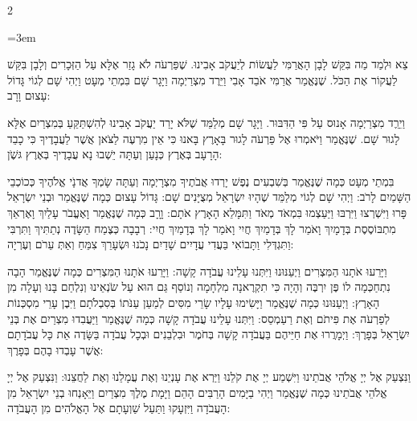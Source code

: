\documentclass[11pt, openany]{book}
\newenvironment{bilingual}{%
  \par\vspace{4pt}%
  \begin{paracol}{2}%
}{%
  \end{paracol}%
  \par\vspace{2pt}%
}
\newenvironment{hebrewcol}{%
  \switchcolumn[1]%
  \begingroup
  \RTL
  \hebrewfont\large
  \setstretch{1.4}%
  \emergencystretch=3em
  \tolerance=9999
  \parindent=0pt\relax
}{%
  \endRTL
  \endgroup
}
\begin{document}
\begin{bilingual}
\begin{hebrewcol}
צֵא וּלְמַד מַה בִּקֵּשׁ לָבָן הָאֲרַמִּי לַעֲשׂוֹת לְיַעֲקֹב אָבִינוּ. שֶׁפַּרְעֹה לֹא גָזַר אֶלָּא עַל הַזְּכָרִים וְלָבָן בִּקֵּשׁ לַעֲקוֹר אֶת הַכֹּל. שֶׁנֶּאֱמַר אֲרַמִּי אֹבֵד אָבִי וַיֵּרֶד מִצְרַיְמָה וַיָּגָר שָׁם בִּמְתֵי מְעָט וַיְהִי שָׁם לְגוֹי גָּדוֹל עָצוּם וָרָב:

וַיֵרֵֶד מִצְרַיְמָה אָנוּס עַל פִּי הַדִּבּוּר. וַיָּגָר שָׁם מְלַמֵּד שֶׁלֹּא יָרַד יַעֲקֹב אָבִינוּ לְהִשְׁתַּקֵּעַ בְּמִצְרַיִם אֶלָּא לָגוּר שָׁם. שֶׁנֶּאֱמַר וַיֹּאמְרוּ אֶל פַּרְעֹה לָגוּר בָּאָרֶץ בָּאנוּ כִּי אֵין מִרְעֶה לַצֹּאן אֲשֶׁר לַעֲבָדֶיךָ כִּי כָבֵד הָרָעָב בְּאֶרֶץ כְּנָעַן וְעַתָּה יֵשְׁבוּ נָא עֲבָדֶיךָ בְּאֶרֶץ גּשֶֹׁן:

בִּמְתֵי מְעָט כְּמָה שֶׁנֶּאֱמַר בְּשִׁבְעִים נֶפֶשׁ יָרְדוּ אֲבֹתֶיךָ מִצְרָיְמָה וְעַתָּה שָׂמְךָ אֲדנָֹי אֱלֹהֶיךָ כְּכוֹכְבֵי הַשָּׁמַיִם לָרֹב: וַיְהִי שָׁם לְגוֹי מְלַמֵּד שֶׁהָיוּ יִשְׂרָאֵל מְצֻיָּנִים שָׁם: גָּדוֹל עָצוּם כְּמָה שֶׁנֶּאֱמַר וּבְנֵי יִשְׂרָאֵל פָּרוּ וַיִּשְׁרְצוּ וַיִּרְבּוּ וַיַּעַצְמוּ בִּמְאֹד מְאֹד וַתִּמָּלֵא הָאָרֶץ אֹתָם: וָרָָב כְּמָה שֶׁנֶּאֱמַר וָאֶעֱבֹר עָלַיִךְ וָאֶרְאֵךְ מִתְבּוֹסֶסֶת בְּדָמָיִךְ וָאֹמַר לָךְ בְּדָמַיִךְ חֲיִי וָאֹמַר לָךְ בְּדָמַיִךְ חֲיִי: רְבָבָה כְּצֶמַח הַשָּׂדֶה נְתַתִּיךְ וַתִּרְבִּי וַתִּגְדְּלִי וַתָּבוֹאִי בַּעֲדִי עֲדָיִים שָׁדַיִם נָכֹנוּ וּשְׂעָרֵךְ צִמֵּחַ וְאַתְּ עֵרֹם וְעֶרְיָה:

וַיָּרֵעוּ אֹתָנוּ הַמִּצְרִים וַיְעַנּוּנוּ וַיִּתְּנוּ עָלֵינוּ עֲבֹדָה קָשָׁה: וַיָּרֵעוּ אֹתָנוּ הַמִּצְרִים כְּמָה שֶׁנֶּאֱמַר הָבָה נִתְחַכְּמָה לוֹ פֶּן יִרְבֶּה וְהָיָה כִּי תִקְרֶאנָה מִלְחָמָה וְנוֹסַף גַּם הוּא עַל שֹׂנְאֵינוּ וְנִלְחַם בָּנוּ וְעָלָה מִן הָאָרֶץ: וַיְעַנּוּנוּ כְּמָה שֶׁנֶּאֱמַר וַיָּשִׂימוּ עָלָיו שָׂרֵי מִסִּים לְמַעַן עַנֹּתוֹ בְּסִבְלֹתָם וַיִּבֶן עָרֵי מִסְכְּנוֹת לְפַרְעֹה אֶת פִּיתֹם וְאֶת רַעַמְסֵס: וַיִּתְּנוּ עָלֵינוּ עֲבֹדָה קָשָׁה כְּמָה שֶׁנֶּאֱמַר וַיַּעֲבִדוּ מִצְרַיִם אֶת בְּנֵי יִשְׂרָאֵל בְּפָרֶךְ: וַיְמָרֲרוּ אֶת חַיֵּיהֶם בַּעֲבֹדָה קָשָׁה בְּחֹמֶר וּבִלְבֵנִים וּבְכָל עֲבֹדָה בַּשָּׂדֶה אֵת כָּל עֲבֹדָתָם אֲשֶׁר עָבְדוּ בָהֶם בְּפָרֶךְ:

וַנִּצְעַק אֶל יְיָ אֱלֹהֵי אֲבֹתֵינוּ וַיִּשְׁמַע יְיָ אֶת קֹלֵנוּ וַיַּרְא אֶת עָנְיֵנוּ וְאֶת עֲמָלֵנוּ וְאֶת לַחֲצֵנוּ: וַנִּצְעַק אֶל יְיָ אֱלֹהֵי אֲבֹתֵינוּ כְּמָה שֶׁנֶּאֱמַר וַיְהִי בַיָּמִים הָרַבִּים הָהֵם וַיָּמָת מֶלֶךְ מִצְרַיִם וַיֵּאָנְחוּ בְנֵי יִשְׂרָאֵל מִן הָעֲבֹדָה וַיִּזְעָקוּ וַתַּעַל שַׁוְעָתָם אֶל הָאֱלֹהִים מִן הָעֲבֹדָה:


\end{hebrewcol}
\end{bilingual}
\end{document}
